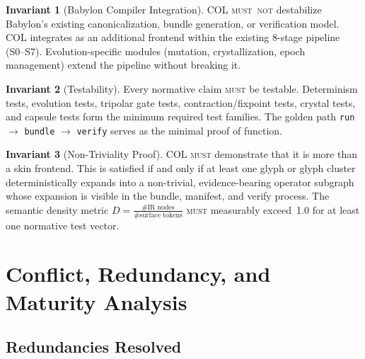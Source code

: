 \documentclass[11pt,a4paper,twoside]{article}
\theoremstyle{definition}
\newtheorem{invariant}{Invariant}[section]
\theoremstyle{remark}
\newcommand{\must}{\textsc{must}}
\newcommand{\mustnot}{\textsc{must~not}}
\begin{document}
\begin{invariant}[Babylon Compiler Integration]
\label{inv:babylon}
COL \mustnot{} destabilize Babylon's existing canonicalization, bundle generation, or verification model. COL integrates as an additional frontend within the existing 8-stage pipeline (S0--S7). Evolution-specific modules (mutation, crystallization, epoch management) extend the pipeline without breaking it.
\end{invariant}

\begin{invariant}[Testability]
\label{inv:testability}
Every normative claim \must{} be testable. Determinism tests, evolution tests, tripolar gate tests, contraction/fixpoint tests, crystal tests, and capsule tests form the minimum required test families. The golden path \texttt{run} $\to$ \texttt{bundle} $\to$ \texttt{verify} serves as the minimal proof of function.
\end{invariant}

\begin{invariant}[Non-Triviality Proof]
\label{inv:nontrivial}
COL \must{} demonstrate that it is more than a skin frontend. This is satisfied if and only if at least one glyph or glyph cluster deterministically expands into a non-trivial, evidence-bearing operator subgraph whose expansion is visible in the bundle, manifest, and verify process. The semantic density metric $D = \frac{\#\text{IR nodes}}{\#\text{surface tokens}}$ \must{} measurably exceed~1.0 for at least one normative test vector.
\end{invariant}



\section{Conflict, Redundancy, and Maturity Analysis}
\label{sec:conflicts}

\subsection{Redundancies Resolved}
\end{document}
